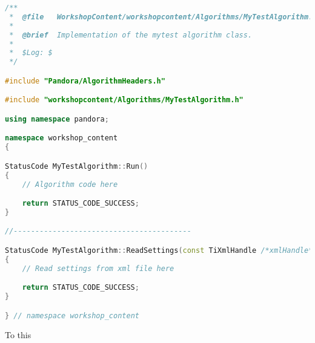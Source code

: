 \begin{lstlisting}[language=C++, caption=Python example]
/**
 *  @file   WorkshopContent/workshopcontent/Algorithms/MyTestAlgorithm.cc
 * 
 *  @brief  Implementation of the mytest algorithm class.
 * 
 *  $Log: $
 */

#include "Pandora/AlgorithmHeaders.h"

#include "workshopcontent/Algorithms/MyTestAlgorithm.h"

using namespace pandora;

namespace workshop_content
{

StatusCode MyTestAlgorithm::Run()
{
    // Algorithm code here

    return STATUS_CODE_SUCCESS;
}

//-----------------------------------------

StatusCode MyTestAlgorithm::ReadSettings(const TiXmlHandle /*xmlHandle*/)
{
    // Read settings from xml file here

    return STATUS_CODE_SUCCESS;
}

} // namespace workshop_content

\end{lstlisting}

To this



